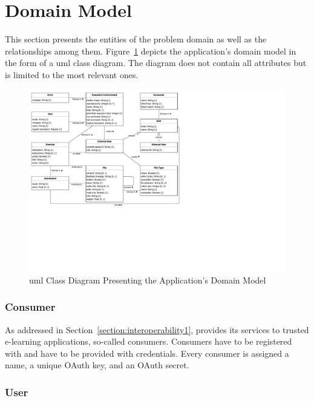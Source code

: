 \section{Domain Model}\label{section:domain-model}

This section presents the entities of the problem domain as well as the relationships among them. Figure~\ref{figure:domain-model1} depicts the application's domain model in the form of a \gls{uml} class diagram. The diagram does not contain all attributes but is limited to the most relevant ones.

\begin{figure}[ht]
\centering
\includegraphics[clip=true, trim=0.3cm 8.1cm 13.2cm 0.3cm, width=\textwidth]{images/domain-model1.pdf}
\caption{\gls{uml} Class Diagram Presenting the Application’s Domain Model}
\label{figure:domain-model1}
\end{figure}

\subsubsection{Consumer}

As addressed in Section~\ref{section:interoperability1}, \tool provides its services to trusted e-learning applications, so-called consumers. Consumers have to be registered with \tool and have to be provided with credentials. Every consumer is assigned a name, a unique OAuth key, and an OAuth secret.

\subsubsection{User}

